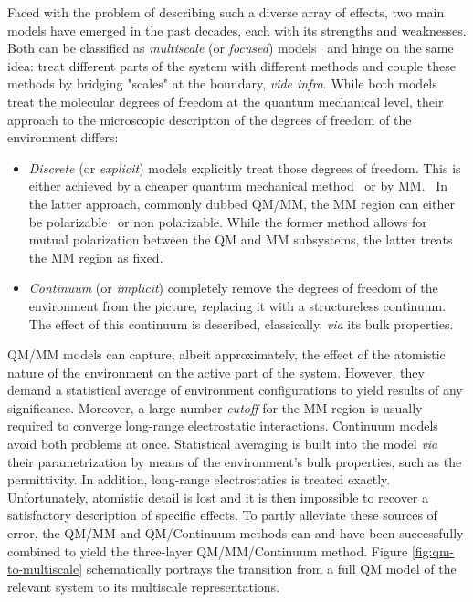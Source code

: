 Faced with the problem of describing such a diverse array of effects,
two main models have emerged in the past decades, each with its
strengths and weaknesses.
Both can be classified as \emph{multiscale} (or \emph{focused})
models~\autocite{Nobel2013} and hinge on the same idea: treat different
parts of the system with different methods and couple these methods by
bridging "scales" at the boundary, \emph{vide infra}.
While both models treat the molecular degrees of freedom at the quantum
mechanical level, their approach to the microscopic description of the
degrees of freedom of the environment differs:
\begin{itemize}
 \item
   \emph{Discrete} (or \emph{explicit}) models explicitly treat those
   degrees of freedom.
   This is either achieved by a cheaper quantum mechanical
   method~\autocite{Vreven2006-gx} or by \gls{MM}.~\autocite{Senn2009-sk}
   In the latter approach, commonly dubbed \acrshort{QM}/\acrshort{MM}, the \acrshort{MM}
   region can either be polarizable~\autocite{Mennucci2013-go,
   Olsen2010-wa, Lipparini2011-rd} or non
   polarizable. While the former method allows for mutual polarization
   between the \acrshort*{QM} and \acrshort*{MM} subsystems, the latter
   treats the \acrshort*{MM} region as fixed.
 \item
   \emph{Continuum} (or \emph{implicit}) completely remove the degrees
   of freedom of the environment from the picture, replacing it with a
   structureless continuum.
   The effect of this continuum is described, classically, \emph{via}
   its bulk properties.~\autocite{Onsager1936-wf, Miertus1981-mm}
\end{itemize}
\acrshort{QM}/\acrshort{MM} models can capture, albeit approximately, the effect
of the atomistic nature of the environment on the active part of the
system.
However, they demand a statistical average of environment configurations
to yield results of any significance. Moreover, a large number
\emph{cutoff} for the \acrshort{MM} region is usually required to converge
long-range electrostatic interactions.\autocite{Steindal2011-ki}
Continuum models avoid both problems at once. Statistical averaging is
built into the model \emph{via} their parametrization by
means of the environment's bulk properties, such as the permittivity.
In addition, long-range electrostatics is treated exactly.
Unfortunately, atomistic detail is lost and it is then impossible to
recover a satisfactory description of specific effects.
To partly alleviate these sources of error, the
\acrshort{QM}/\acrshort{MM} and \acrshort{QM}/Continuum methods can and
have been successfully combined to yield the three-layer
\acrshort{QM}/\acrshort{MM}/Continuum method.\autocite{Steindal2011-ki,
Lipparini2011-rd, Caprasecca2012-ir, Lipparini2013-ud}
Figure \ref{fig:qm-to-multiscale} schematically portrays the transition
from a full \acrshort{QM} model of the relevant system to its multiscale
representations.

